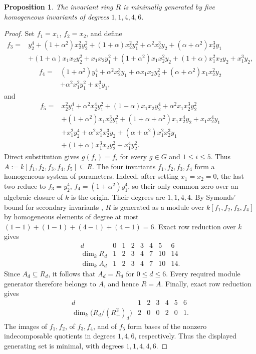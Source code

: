\documentclass[11pt]{article}
\newtheorem{proposition}[theorem]{Proposition}
\theoremstyle{definition}
\begin{document}
\begin{proposition}
	\label{prop:unrestricted-ring}
	The invariant ring $R$ is minimally generated by five homogeneous
	invariants of degrees $1,1,4,4,6$.
\end{proposition}

\begin{proof}
	Set $f_1=x_1$, $f_2=x_2$, and define
	\[
	\begin{aligned}
		f_3={}&y_2^4+(1+\alpha^2)x_2^2y_2^2
		+(1+\alpha)x_2^2y_1^2+\alpha^2x_2^3y_2
		+(\alpha+\alpha^2)x_2^3y_1\\
		&+(1+\alpha)x_1x_2y_2^2+x_1x_2y_1^2
		+(1+\alpha^2)x_1x_2^2y_2
		+(1+\alpha)x_1^2x_2y_2+x_1^3y_2,
	\end{aligned}
	\]
	\[
	\begin{aligned}
		f_4={}&(1+\alpha^2)y_1^4+\alpha^2x_2^3y_1
		+\alpha x_1x_2y_2^2+(\alpha+\alpha^2)x_1x_2^2y_2\\
		&+\alpha^2x_1^2y_1^2+x_1^3y_1,
	\end{aligned}
	\]
	and
	\[
	\begin{aligned}
		f_5={}&x_2^2y_1^4+\alpha^2x_2^4y_1^2
		+(1+\alpha)x_1x_2y_2^4+\alpha^2x_1x_2^3y_2^2\\
		&+(1+\alpha^2)x_1x_2^3y_1^2
		+(1+\alpha+\alpha^2)x_1x_2^4y_2+x_1x_2^4y_1\\
		&+x_1^2y_2^4+\alpha^2x_1^2x_2^3y_2
		+(\alpha+\alpha^2)x_1^2x_2^3y_1\\
		&+(1+\alpha)x_1^3x_2y_2^2+x_1^4y_2^2.
	\end{aligned}
	\]
	Direct substitution gives $g(f_i)=f_i$ for every $g\in G$ and $1\leq i\leq5$.  Thus $A:=k[f_1,f_2,f_3,f_4,f_5]\subseteq R$. The four invariants $f_1,f_2,f_3,f_4$ form a homogeneous system of
	parameters.  Indeed, after setting $x_1=x_2=0$, the last two reduce to $f_3=y_2^4,\, f_4=(1+\alpha^2)y_1^4$, so their only common zero over an algebraic closure of $k$ is the origin.  Their degrees are $1,1,4,4$.  By Symonds' bound for secondary
	invariants \cite{Sy}, $R$ is generated as a module over $k[f_1,f_2,f_3,f_4]$ by homogeneous elements of degree at most $(1-1)+(1-1)+(4-1)+(4-1)=6$. Exact row reduction over $k$ gives
	\[
	\begin{array}{c|rrrrrrr}
		d&0&1&2&3&4&5&6\\ \hline
		\dim_k R_d&1&2&3&4&7&10&14\\
		\dim_k A_d&1&2&3&4&7&10&14.
	\end{array}
	\]
	Since $A_d\subseteq R_d$, it follows that $A_d=R_d$ for
	$0\leq d\leq6$.  Every required module generator therefore belongs to $A$, and hence $R=A$. Finally, exact row reduction gives
	\[
	\begin{array}{c|rrrrrr}
		d&1&2&3&4&5&6\\ \hline
		\dim_k\bigl(R_d/(R_+^2)_d\bigr)&2&0&0&2&0&1.
	\end{array}
	\]
	The images of $f_1,f_2$, of $f_3,f_4$, and of $f_5$ form bases of the
	nonzero indecomposable quotients in degrees $1,4,6$, respectively.
	Thus the displayed generating set is minimal, with degrees
	$1,1,4,4,6$.
\end{proof}
\end{document}
